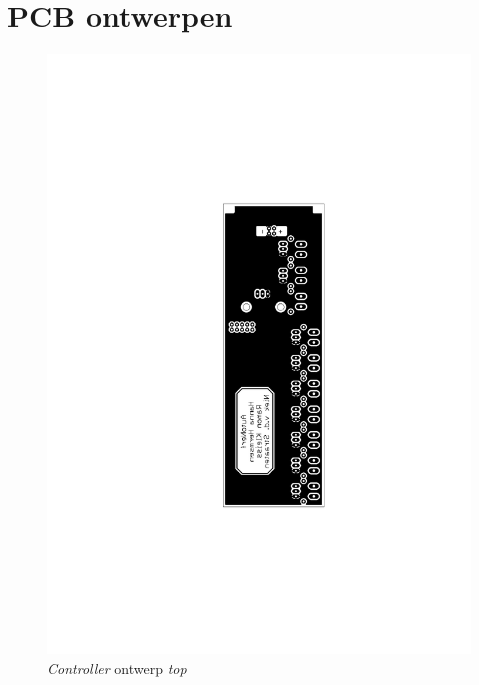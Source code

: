 \chapter{PCB ontwerpen}
\label{app:pcb}

\begin{figure}
    \includegraphics[scale=0.75]{figures/controller_top.pdf}
    \caption{\emph{Controller} ontwerp \emph{top}}
\end{figure}

